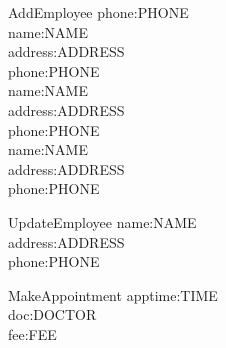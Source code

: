 \documentclass[10pt]{article}
\begin{document}
\begin{schema}{AddEmployee}
     phone:PHONE                                                                                    \\
     name:NAME                                                                                      \\
     address:ADDRESS                                                                                \\
     phone:PHONE                                                                                    \\
     name:NAME                                                                                      \\
     address:ADDRESS                                                                                \\
     phone:PHONE                                                                                    \\
     name:NAME                                                                                      \\
     address:ADDRESS                                                                                \\
     phone:PHONE                                                                                    \\
\end{schema}

\begin{schema}{UpdateEmployee}
     name:NAME                                                                                      \\
     address:ADDRESS                                                                                \\
     phone:PHONE                                                                                    \\
\end{schema}

\begin{schema}{MakeAppointment}
     apptime:TIME                                                                                   \\
     doc:DOCTOR                                                                                     \\
     fee:FEE                                                                                        \\
\end{schema}
\end{document}
